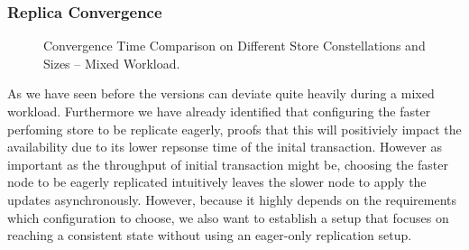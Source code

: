 

\subsubsection{Replica Convergence} 




\begin{figure}[t] 
    \centering 
    \caption{Convergence Time Comparison on Different Store Constellations and Sizes -- Mixed Workload.}
    \label{fig:store_comparision}
\end{figure}

As we have seen before the versions can deviate quite heavily during a mixed workload. 
Furthermore we have already identified that configuring the faster perfoming store to be replicate eagerly, proofs that this will positiviely impact 
the availability due to its lower repsonse time of the inital transaction.
However as important as the throughput of initial transaction might be, choosing the faster node to be eagerly replicated intuitively leaves the slower node
to apply the updates asynchronously. 
However, because it highly depends on the requirements which configuration to choose, we also want to establish a setup that focuses on reaching
a consistent state without using an eager-only replication setup.



